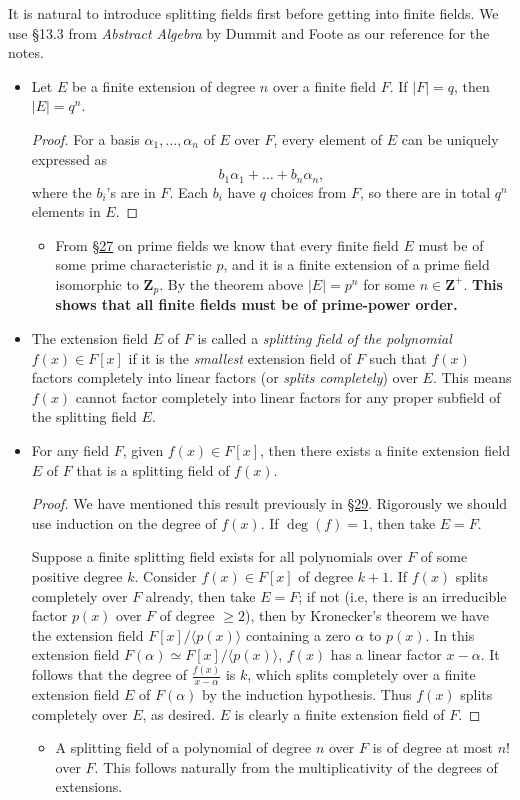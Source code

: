 \documentclass[11pt]{article}
\newcommand{\lk}[2]{\hyperlink{subsection.#1.#2}{\S#2}} %
\newcommand{\Z}{\mathbf{Z}}
\newcommand{\df}[1]{\textit{\textsf{#1}}}
\newcommand{\la}{\langle}
\newcommand{\ra}{\rangle}
\newcommand{\abs}[1]{\lvert #1 \rvert}
\begin{document}
It is natural to introduce splitting fields first before getting into finite fields. We use \S13.3 from \textit{Abstract Algebra} by Dummit and Foote as our reference for the notes.
\begin{itemize}
    \item Let $E$ be a finite extension of degree $n$ over a finite field $F$. If $\abs{F} = q$, then $\abs{E} = q^n$.
    \begin{proof}
        For a basis $\alpha_1,\dots,\alpha_n$ of $E$ over $F$, every element of $E$ can be uniquely expressed as \[b_1\alpha_1 + \dots + b_n\alpha_n,\] where the $b_i$'s are in $F$. Each $b_i$ have $q$ choices from $F$, so there are in total $q^n$ elements in $E$.
    \end{proof}
    \begin{itemize}
        \item From \lk{5}{27} on prime fields we know that every finite field $E$ must be of some prime characteristic $p$, and it is a finite extension of a prime field isomorphic to $\Z_p$. By the theorem above $\abs{E} = p^n$ for some $n \in \Z^+$. \textbf{This shows that all finite fields must be of prime-power order.}
    \end{itemize}
    \item The extension field $E$ of $F$ is called a \df{splitting field of the polynomial $f(x) \in F[x]$} if it is the \emph{smallest} extension field of $F$ such that $f(x)$ factors completely into linear factors (or \df{splits completely}) over $E$. This means $f(x)$ cannot factor completely into linear factors for any proper subfield of the splitting field $E$.
    \item For any field $F$, given $f(x) \in F[x]$, then there exists a finite extension field $E$ of $F$ that is a splitting field of $f(x)$.
    \begin{proof}
        We have mentioned this result previously in \lk{6}{29}. Rigorously we should use induction on the degree of $f(x)$. If $\deg(f) = 1$, then take $E = F$.
        
        Suppose a finite splitting field exists for all polynomials over $F$ of some positive degree $k$. Consider $f(x) \in F[x]$ of degree $k+1$. If $f(x)$ splits completely over $F$ already, then take $E = F$; if not (i.e, there is an irreducible factor $p(x)$ over $F$ of degree $\geq 2$), then by Kronecker's theorem we have the extension field $F[x]/\la p(x) \ra$ containing a zero $\alpha$ to $p(x)$. In this extension field $F(\alpha) \simeq F[x]/\la p(x) \ra$, $f(x)$ has a linear factor $x - \alpha$. It follows that the degree of $\frac{f(x)}{x-\alpha}$ is $k$, which splits completely over a finite extension field $E$ of $F(\alpha)$ by the induction hypothesis. Thus $f(x)$ splits completely over $E$, as desired. $E$ is clearly a finite extension field of $F$.
    \end{proof}
    \begin{itemize}
        \item A splitting field of a polynomial of degree $n$ over $F$ is of degree at most $n!$ over $F$. This follows naturally from the multiplicativity of the degrees of extensions. 
    \end{itemize}
    

\end{itemize}
\end{document}
